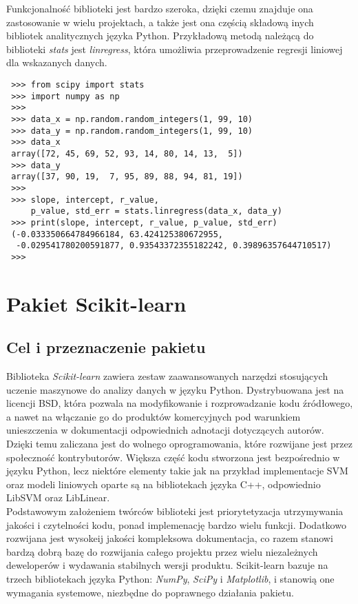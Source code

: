 Funkcjonalność biblioteki jest bardzo szeroka, dzięki czemu znajduje ona zastosowanie w wielu projektach, a także jest ona częścią składową inych bibliotek analitycznych języka Python.
Przykładową metodą należącą do biblioteki \textit{stats} jest \textit{linregress}, która umożliwia przeprowadzenie regresji liniowej dla wskazanych danych.
\begin{lstlisting}
 >>> from scipy import stats
 >>> import numpy as np
 >>>
 >>> data_x = np.random.random_integers(1, 99, 10)
 >>> data_y = np.random.random_integers(1, 99, 10)
 >>> data_x
 array([72, 45, 69, 52, 93, 14, 80, 14, 13,  5])
 >>> data_y
 array([37, 90, 19,  7, 95, 89, 88, 94, 81, 19])
 >>>
 >>> slope, intercept, r_value,
     p_value, std_err = stats.linregress(data_x, data_y)
 >>> print(slope, intercept, r_value, p_value, std_err)
 (-0.033350664784966184, 63.424125380672955,
  -0.029541780200591877, 0.93543372355182242, 0.39896357644710517)
 >>> 
\end{lstlisting}

\section{Pakiet Scikit-learn}

\subsection{Cel i przeznaczenie pakietu}
Biblioteka \textit{Scikit-learn} zawiera zestaw zaawansowanych narzędzi stosujących uczenie maszynowe do analizy danych w języku Python.
Dystrybuowana jest na licencji BSD, która pozwala na modyfikowanie i rozprowadzanie kodu źródłowego, a nawet na włączanie go do produktów komercyjnych pod warunkiem unieszczenia w dokumentacji odpowiednich adnotacji dotyczących autorów.
Dzięki temu zaliczana jest do wolnego oprogramowania, które rozwijane jest przez społeczność kontrybutorów.
Większa część kodu stworzona jest bezpośrednio w języku Python, lecz niektóre elementy takie jak na przykład implementacje SVM oraz modeli liniowych oparte są na bibliotekach języka C++, odpowiednio LibSVM oraz LibLinear\cite{scikit_article}.\\

Podstawowym założeniem twórców biblioteki jest priorytetyzacja utrzymywania jakości i czytelności kodu, ponad implemenację bardzo wielu funkcji\cite{scikit_article}.
Dodatkowo rozwijana jest wysokeij jakości kompleksowa dokumentacja, co razem stanowi bardzą dobrą bazę do rozwijania całego projektu przez wielu niezależnych deweloperów i wydawania stabilnych wersji produktu.
Scikit-learn bazuje na trzech bibliotekach języka Python: \textit{NumPy}, \textit{SciPy} i \textit{Matplotlib}, i stanowią one wymagania systemowe, niezbędne do poprawnego działania pakietu.\\


